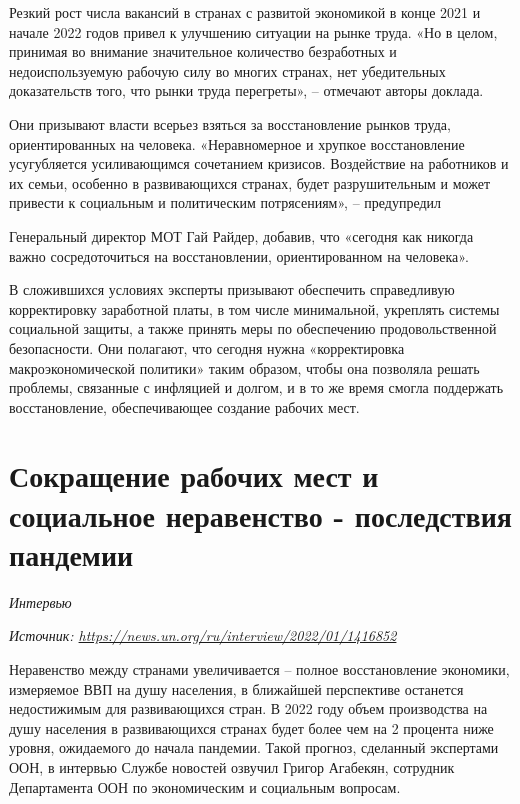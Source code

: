 Резкий рост числа вакансий в странах с развитой экономикой в конце 2021 и начале 2022 годов привел к улучшению ситуации на рынке труда. «Но в целом, принимая во внимание значительное количество безработных и недоиспользуемую рабочую силу во многих странах, нет убедительных доказательств того, что рынки труда перегреты», – отмечают авторы доклада.

Они призывают власти всерьез взяться за восстановление рынков труда, ориентированных на человека. «Неравномерное и хрупкое восстановление усугубляется усиливающимся сочетанием кризисов. Воздействие на работников и их семьи, особенно в развивающихся странах, будет разрушительным и может привести к социальным и политическим потрясениям», – предупредил

Генеральный директор МОТ Гай Райдер, добавив, что «сегодня как никогда важно сосредоточиться на восстановлении, ориентированном на человека».

В сложившихся условиях эксперты призывают обеспечить справедливую корректировку заработной платы, в том числе минимальной, укреплять системы социальной защиты, а также принять меры по обеспечению продовольственной безопасности.
Они полагают, что сегодня нужна «корректировка макроэкономической политики» таким образом, чтобы она позволяла решать проблемы, связанные с инфляцией и долгом, и в то же время смогла поддержать восстановление, обеспечивающее создание рабочих мест.


\newpage
\section[Сокращение рабочих мест]{Сокращение рабочих мест и социальное неравенство - последствия пандемии}

\textit{Интервью}

\textit{Источник: \url{https://news.un.org/ru/interview/2022/01/1416852}}


\begin{fancyquotes}
    Неравенство между странами увеличивается – полное восстановление экономики, измеряемое ВВП на душу населения, в ближайшей перспективе останется недостижимым для развивающихся стран. В 2022 году объем производства на душу населения в развивающихся странах будет более чем на 2 процента ниже уровня, ожидаемого до начала пандемии. Такой прогноз, сделанный экспертами ООН, в интервью Службе новостей озвучил Григор Агабекян, сотрудник Департамента ООН по экономическим и социальным вопросам.
\end{fancyquotes}

